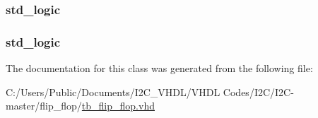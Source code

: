 \subsubsection[{\texorpdfstring{R\+W\+\_\+\+R\+C\+\_\+data\+\_\+out}{RW_RC_data_out}}]{ {\bfseries \textcolor{vhdlchar}{std\+\_\+logic}\textcolor{vhdlchar}{ }} \hspace{0.3cm}{\ttfamily [Signal]}}\hypertarget{classtb__flip__flop_1_1behavior_ae07aef622ce63f91f4c3a1fb44ec0327}{}\label{classtb__flip__flop_1_1behavior_ae07aef622ce63f91f4c3a1fb44ec0327}
\subsubsection[{\texorpdfstring{R\+W\+\_\+\+R\+C\+\_\+write\+\_\+command}{RW_RC_write_command}}]{ {\bfseries \textcolor{vhdlchar}{std\+\_\+logic}\textcolor{vhdlchar}{ }} \hspace{0.3cm}{\ttfamily [Signal]}}\hypertarget{classtb__flip__flop_1_1behavior_a6542f766c26e9bbf9172760115f6ea9c}{}\label{classtb__flip__flop_1_1behavior_a6542f766c26e9bbf9172760115f6ea9c}


The documentation for this class was generated from the following file\+:\begin{DoxyCompactItemize}
\item 
C\+:/\+Users/\+Public/\+Documents/\+I2\+C\+\_\+\+V\+H\+D\+L/\+V\+H\+D\+L Codes/\+I2\+C/\+I2\+C-\/master/flip\+\_\+flop/\hyperlink{tb__flip__flop_8vhd}{tb\+\_\+flip\+\_\+flop.\+vhd}\end{DoxyCompactItemize}
